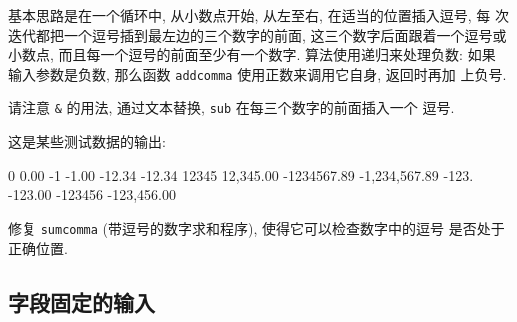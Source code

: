 基本思路是在一个循环中, 从小数点开始, 从左至右, 在适当的位置插入逗号, 每
次迭代都把一个逗号插到最左边的三个数字的前面, 这三个数字后面跟着一个逗号或
小数点, 而且每一个逗号的前面至少有一个数字. 算法使用递归来处理负数: 如果 
输入参数是负数, 那么函数 \verb'addcomma' 使用正数来调用它自身, 返回时再加
上负号.
请注意 \verb'&' 的用法, 通过文本替换, \verb'sub' 在每三个数字的前面插入一个
逗号.

这是某些测试数据的输出:
\begin{shell}
    0                            0.00
    -1                          -1.00
    -12.34                     -12.34
    12345                   12,345.00
    -1234567.89         -1,234,567.89
    -123.                     -123.00
    -123456               -123,456.00
\end{shell}

\begin{exercise}
    修复 \verb'sumcomma' (带逗号的数字求和程序), 使得它可以检查数字中的逗号
    是否处于正确位置.
\end{exercise}

\subsection{字段固定的输入}
\label{subsec:fixed_field_input}

